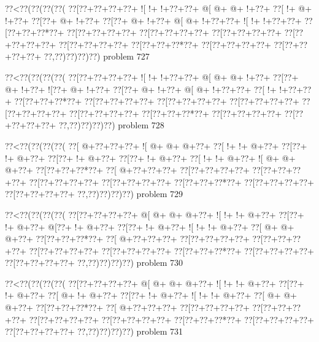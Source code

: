 \vbox{\vbox{\goo
\0??<\0??(\0??(\0??(\0??(
\0??[\0??+\0??+\0??+\0??+
\- ![\- !+\- !+\0??+\0??+
\- @[\- @+\- @+\- !+\0??+
\0??[\- !+\- @+\- !+\0??+
\0??[\0??+\- @+\- !+\0??+
\0??[\0??+\- @+\- !+\0??+
\- @[\- @+\- !+\0??+\0??+
\- ![\- !+\- !+\0??+\0??+
\0??[\0??+\0??+\0??*\0??+
\0??[\0??+\0??+\0??+\0??+
\0??[\0??+\0??+\0??+\0??+
\0??[\0??+\0??+\0??+\0??+
\0??[\0??+\0??+\0??+\0??+
\0??[\0??+\0??+\0??+\0??+
\0??[\0??+\0??+\0??*\0??+
\0??[\0??+\0??+\0??+\0??+
\0??[\0??+\0??+\0??+\0??+
\0??,\0??)\0??)\0??)\0??)
}
\hfil problem 727\hfil\break
}

\vbox{\vbox{\goo
\0??<\0??(\0??(\0??(\0??(
\0??[\0??+\0??+\0??+\0??+
\- ![\- !+\- !+\0??+\0??+
\- @[\- @+\- @+\- !+\0??+
\0??[\0??+\- @+\- !+\0??+
\- ![\0??+\- @+\- !+\0??+
\0??[\0??+\- @+\- !+\0??+
\- @[\- @+\- !+\0??+\0??+
\0??[\- !+\- !+\0??+\0??+
\0??[\0??+\0??+\0??*\0??+
\0??[\0??+\0??+\0??+\0??+
\0??[\0??+\0??+\0??+\0??+
\0??[\0??+\0??+\0??+\0??+
\0??[\0??+\0??+\0??+\0??+
\0??[\0??+\0??+\0??+\0??+
\0??[\0??+\0??+\0??*\0??+
\0??[\0??+\0??+\0??+\0??+
\0??[\0??+\0??+\0??+\0??+
\0??,\0??)\0??)\0??)\0??)
}
\hfil problem 728\hfil\break
}

\vbox{\vbox{\goo
\0??<\0??(\0??(\0??(\0??(
\0??[\- @+\0??+\0??+\0??+
\- ![\- @+\- @+\- @+\0??+
\0??[\- !+\- !+\- @+\0??+
\0??[\0??+\- !+\- @+\0??+
\0??[\0??+\- !+\- @+\0??+
\0??[\0??+\- !+\- @+\0??+
\0??[\- !+\- !+\- @+\0??+
\- ![\- @+\- @+\- @+\0??+
\0??[\0??+\0??+\0??*\0??+
\0??[\- @+\0??+\0??+\0??+
\0??[\0??+\0??+\0??+\0??+
\0??[\0??+\0??+\0??+\0??+
\0??[\0??+\0??+\0??+\0??+
\0??[\0??+\0??+\0??+\0??+
\0??[\0??+\0??+\0??*\0??+
\0??[\0??+\0??+\0??+\0??+
\0??[\0??+\0??+\0??+\0??+
\0??,\0??)\0??)\0??)\0??)
}
\hfil problem 729\hfil\break
}

\vbox{\vbox{\goo
\0??<\0??(\0??(\0??(\0??(
\0??[\0??+\0??+\0??+\0??+
\- @[\- @+\- @+\- @+\0??+
\- ![\- !+\- !+\- @+\0??+
\0??[\0??+\- !+\- @+\0??+
\- @[\0??+\- !+\- @+\0??+
\0??[\0??+\- !+\- @+\0??+
\- ![\- !+\- !+\- @+\0??+
\0??[\- @+\- @+\- @+\0??+
\0??[\0??+\0??+\0??*\0??+
\0??[\- @+\0??+\0??+\0??+
\0??[\0??+\0??+\0??+\0??+
\0??[\0??+\0??+\0??+\0??+
\0??[\0??+\0??+\0??+\0??+
\0??[\0??+\0??+\0??+\0??+
\0??[\0??+\0??+\0??*\0??+
\0??[\0??+\0??+\0??+\0??+
\0??[\0??+\0??+\0??+\0??+
\0??,\0??)\0??)\0??)\0??)
}
\hfil problem 730\hfil\break
}

\vbox{\vbox{\goo
\0??<\0??(\0??(\0??(\0??(
\0??[\0??+\0??+\0??+\0??+
\- @[\- @+\- @+\- @+\0??+
\- ![\- !+\- !+\- @+\0??+
\0??[\0??+\- !+\- @+\0??+
\0??[\- @+\- !+\- @+\0??+
\0??[\0??+\- !+\- @+\0??+
\- ![\- !+\- !+\- @+\0??+
\0??[\- @+\- @+\- @+\0??+
\0??[\0??+\0??+\0??*\0??+
\0??[\- @+\0??+\0??+\0??+
\0??[\0??+\0??+\0??+\0??+
\0??[\0??+\0??+\0??+\0??+
\0??[\0??+\0??+\0??+\0??+
\0??[\0??+\0??+\0??+\0??+
\0??[\0??+\0??+\0??*\0??+
\0??[\0??+\0??+\0??+\0??+
\0??[\0??+\0??+\0??+\0??+
\0??,\0??)\0??)\0??)\0??)
}
\hfil problem 731\hfil\break
}

